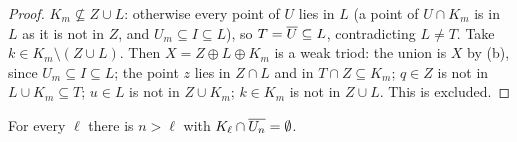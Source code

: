 \begin{proof}
$K_m\not\subseteq Z\cup L$: otherwise every point of $U$ lies in $L$ (a point of $U\cap K_m$ is in $L$ as
it is not in $Z$, and $U_m\subseteq I\subseteq L$), so $T=\overline{U}\subseteq L$, contradicting $L\ne T$. Take $k\in
K_m\setminus(Z\cup L)$. Then $X=Z\oplus L\oplus K_m$ is a weak triod: the union is $X$ by (b), since
$U_m\subseteq I\subseteq L$; the point $z$ lies in $Z\cap L$ and in $T\cap Z\subseteq K_m$; $q\in Z$ is not in
$L\cup K_m\subseteq T$; $u\in L$ is not in $Z\cup K_m$; $k\in K_m$ is not in $Z\cup L$. This is excluded.
\end{proof}

\begin{lemma}\label{lem:sorg-star}
For every $\ell$ there is $n>\ell$ with $K_\ell\cap\overline{U_n}=\emptyset$.
\end{lemma}

